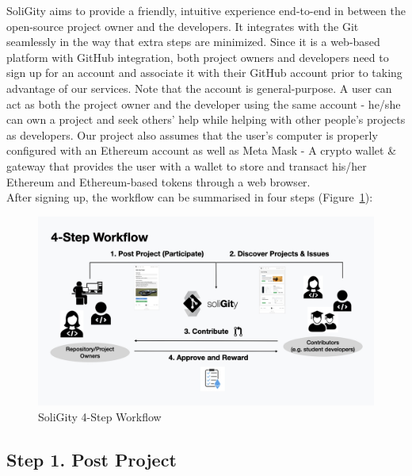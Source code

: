 \documentclass[12pt]{article}
\renewcommand{\_}{\kern-1.5pt\textunderscore\kern-1.5pt}
\begin{document}
SoliGity aims to provide a friendly, intuitive experience end-to-end in between the open-source project owner and the developers. It integrates with the Git seamlessly in the way that extra steps are minimized. Since it is a web-based platform with GitHub integration, both project owners and developers need to sign up for an account and associate it with their GitHub account prior to taking advantage of our services. Note that the account is general-purpose. A user can act as both the project owner and the developer using the same account - he/she can own a project and seek others’ help while helping with other people’s projects as developers. Our project also assumes that the user’s computer is properly configured with an Ethereum account as well as Meta Mask - A crypto wallet \& gateway that provides the user with a wallet to store and transact his/her Ethereum and Ethereum-based tokens through a web browser. \\

\noindent After signing up, the workflow can be summarised in four steps (Figure~\ref{fig:workflow1}):

\begin{figure}[h]
	\centering
	\includegraphics[width=16.5cm]{graphs/00a. workflow.jpeg}
	\caption{SoliGity 4-Step Workflow}
	\label{fig:workflow1}
\end{figure}


\subsection*{Step 1. Post Project}
\end{document}
